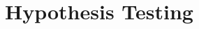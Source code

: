 \documentclass[../../main.tex]{subfiles}
\begin{document}
\chapter{Hypothesis Testing}
\end{document}
